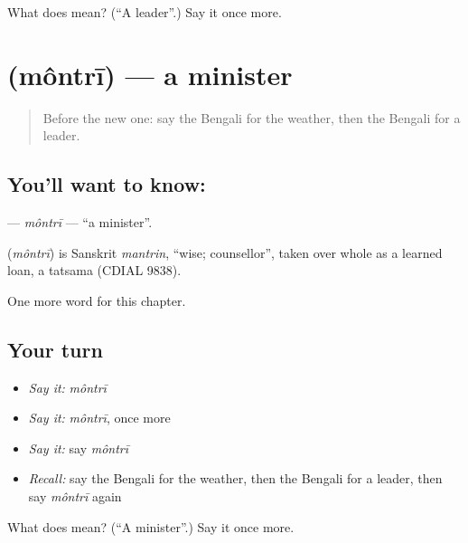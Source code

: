 \begin{tcolorbox}[breakable,colback=teal!4,colframe=teal!35!black,title={Before you move on}]
What does  mean? (\textquotedblleft{}A leader\textquotedblright{}.) Say it once more.
\end{tcolorbox}
\section[\texorpdfstring{\bn{মন্ত্রী} (môntrī)}{মন্ত্রী (môntrī)}]{ (môntrī) — a minister}

\label{lesson:BN-C230-montri}



\begin{quote}
Before the new one: say the Bengali for the weather, then the Bengali for a leader.
\end{quote}

\subsection*{You'll want to know: }
\textbf{} — \emph{môntrī} — \textquotedblleft{}a minister\textquotedblright{}.

\begin{cousinweb}
\textbf{} (\emph{môntrī}) is Sanskrit \emph{mantrin}, \textquotedblleft{}wise; counsellor\textquotedblright{}, taken over whole as a learned loan, a tatsama (CDIAL 9838).
\end{cousinweb}

\begin{grammarlens}[title={What you've built}]
One more word for this chapter.
\end{grammarlens}

\subsection*{Your turn}
\begin{itemize}
\raggedright
  \item \emph{Say it:} \emph{môntrī}
  \item \emph{Say it:} \emph{môntrī}, once more
  \item \emph{Say it:} say \emph{môntrī}
  \item \emph{Recall:} say the Bengali for the weather, then the Bengali for a leader, then say \emph{môntrī} again
\end{itemize}

\begin{tcolorbox}[breakable,colback=teal!4,colframe=teal!35!black,title={Before you move on}]
What does  mean? (\textquotedblleft{}A minister\textquotedblright{}.) Say it once more.
\end{tcolorbox}
